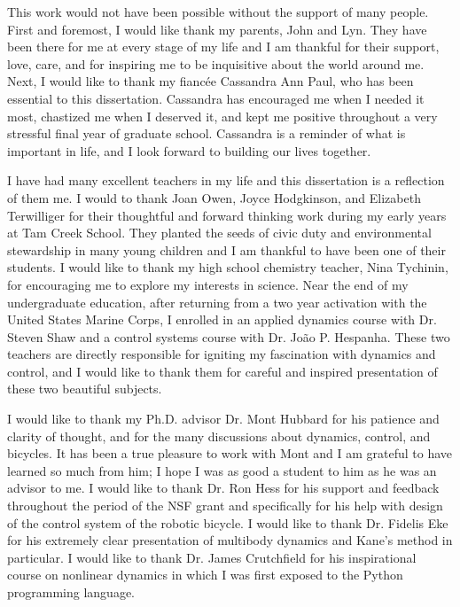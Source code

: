 \label{acknowledgements}
This work would not have been possible without the support of many people.
First and foremost, I would like thank my parents, John and Lyn. They have been
there for me at every stage of my life and I am thankful for their support,
love, care, and for inspiring me to be inquisitive about the world around me.
Next, I would like to thank my fianc\'ee Cassandra Ann Paul, who has been
essential to this dissertation. Cassandra has encouraged me when I needed it
most, chastized me when I deserved it, and kept me positive throughout a very
stressful final year of graduate school. Cassandra is a reminder of what is
important in life, and I look forward to building our lives together.

I have had many excellent teachers in my life and this dissertation is a
reflection of them me. I would to thank Joan Owen, Joyce Hodgkinson, and
Elizabeth Terwilliger for their thoughtful and forward thinking work during my
early years at Tam Creek School. They planted the seeds of civic duty and
environmental stewardship in many young children and I am thankful to have been
one of their students. I would like to thank my high school chemistry teacher,
Nina Tychinin, for encouraging me to explore my interests in science. Near the
end of my undergraduate education, after returning from a two year activation
with the United States Marine Corps, I enrolled in an applied dynamics course
with Dr. Steven Shaw and a control systems course with Dr. Jo\~{a}o P.
Hespanha. These two teachers are directly responsible for igniting my
fascination with dynamics and control, and I would like to thank them for
careful and inspired presentation of these two beautiful subjects.

I would like to thank my Ph.D. advisor Dr. Mont Hubbard for his patience and
clarity of thought, and for the many discussions about dynamics, control, and
bicycles. It has been a true pleasure to work with Mont and I am grateful to
have learned so much from him; I hope I was as good a student to him as he was
an advisor to me. I would like to thank Dr. Ron Hess for his support and
feedback throughout the period of the NSF grant and specifically for his help
with design of the control system of the robotic bicycle. I would like to thank
Dr. Fidelis Eke for his extremely clear presentation of multibody dynamics and
Kane's method in particular. I would like to thank Dr. James
Crutchfield for his inspirational course on nonlinear dynamics in which I was
first exposed to the Python programming language.

